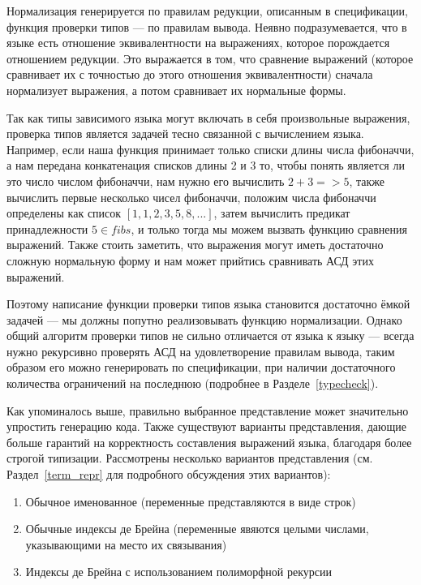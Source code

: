 Нормализация генерируется по правилам редукции, описанным в спецификации, функция проверки типов --- по правилам вывода. Неявно подразумевается, что в языке есть отношение эквивалентности на выражениях, которое порождается отношением редукции. Это выражается в том, что сравнение выражений (которое сравнивает их с точностью до этого отношения эквивалентности) сначала нормализует выражения, а потом сравнивает их нормальные формы.

Так как типы зависимого языка могут включать в себя произвольные выражения, проверка типов является задачей тесно связанной с вычислением языка. Например, если наша функция принимает только списки длины числа фибоначчи, а нам передана конкатенация списков длины 2 и 3 то, чтобы понять является ли это число числом фибоначчи, нам нужно его вычислить $2 + 3 => 5$, также вычислить первые несколько чисел фибоначчи, положим числа фибоначчи определены как список $[1,1,2,3,5,8,...]$, затем вычислить предикат принадлежности $5 \in fibs$, и только тогда мы можем вызвать функцию сравнения выражений. Также стоить заметить, что выражения могут иметь достаточно сложную нормальную форму и нам может прийтись сравнивать АСД этих выражений.

Поэтому написание функции проверки типов языка становится достаточно ёмкой задачей --- мы должны попутно реализовывать функцию нормализации. Однако общий алгоритм проверки типов не сильно отличается от языка к языку --- всегда нужно рекурсивно проверять АСД на удовлетворение правилам вывода, таким образом его можно генерировать по спецификации, при наличии достаточного количества ограничений на последнюю (подробнее в Разделе~\ref{typecheck}).


Как упоминалось выше, правильно выбранное представление может значительно упростить генерацию кода. Также существуют варианты представления, дающие больше гарантий на корректность составления выражений языка, благодаря более строгой типизации. Рассмотрены несколько вариантов представления (см. Раздел~\ref{term_repr} для подробного обсуждения этих вариантов):
\begin{enumerate}
\item Обычное именованное (переменные представляются в виде строк)
\item Обычные индексы де Брейна\cite{de_brujin} (переменные явяются целыми числами, указывающими на место их связывания)
\item Индексы де Брейна с использованием полиморфной рекурсии\cite{poly_rec}
\end{enumerate}

